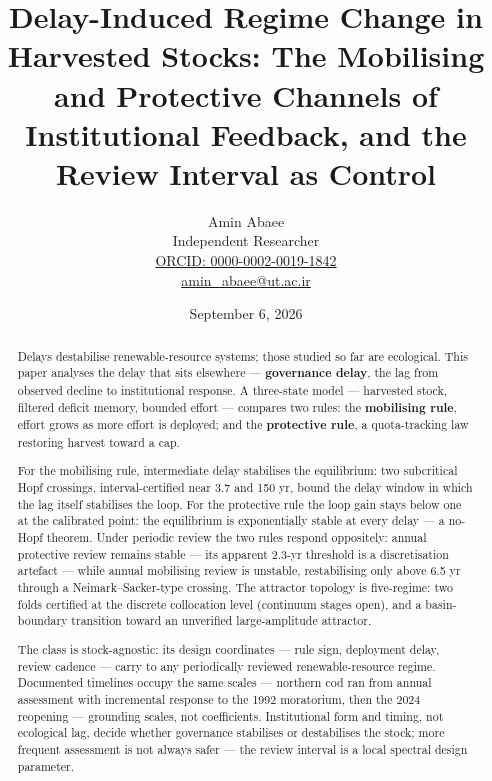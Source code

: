 \documentclass[11pt]{article}
\begin{document}
\title{Delay-Induced Regime Change in Harvested Stocks: The Mobilising and Protective Channels of Institutional Feedback, and the Review Interval as Control}
\author{Amin Abaee\\[0.35em]
{\small Independent Researcher}\\[0.55em]
{\small\href{https://orcid.org/0000-0002-0019-1842}{ORCID: 0000-0002-0019-1842}}\\[0.3em]
{\small\href{mailto:amin\_abaee@ut.ac.ir}{amin\_abaee@ut.ac.ir}}}
\date{September 6, 2026}
\maketitle

\begin{abstract}


Delays destabilise renewable-resource systems; those studied so far are
ecological. This paper analyses the delay that sits elsewhere ---
\textbf{governance delay}, the lag from observed decline to
institutional response. A three-state model --- harvested stock,
filtered deficit memory, bounded effort --- compares two rules: the
\textbf{mobilising rule}, effort grows as more effort is deployed; and
the \textbf{protective rule}, a quota-tracking law restoring harvest
toward a cap.

For the mobilising rule, intermediate delay stabilises the equilibrium:
two subcritical Hopf crossings, interval-certified near 3.7 and 150 yr,
bound the delay window in which the lag itself stabilises the loop. For
the protective rule the loop gain stays below one at the calibrated
point: the equilibrium is exponentially stable at every delay --- a
no-Hopf theorem. Under periodic review the two rules respond oppositely:
annual protective review remains stable --- its apparent 2.3-yr
threshold is a discretisation artefact --- while annual mobilising
review is unstable, restabilising only above 6.5 yr through a
Neimark--Sacker-type crossing. The attractor topology is five-regime:
two folds certified at the discrete collocation level (continuum stages
open), and a basin-boundary transition toward an unverified
large-amplitude attractor.

The class is stock-agnostic: its design coordinates --- rule sign,
deployment delay, review cadence --- carry to any periodically reviewed
renewable-resource regime. Documented timelines occupy the same scales
--- northern cod ran from annual assessment with incremental response to
the 1992 moratorium, then the 2024 reopening --- grounding scales, not
coefficients. Institutional form and timing, not ecological lag, decide
whether governance stabilises or destabilises the stock; more frequent
assessment is not always safer --- the review interval is a local
spectral design parameter.

\end{abstract}
\end{document}
